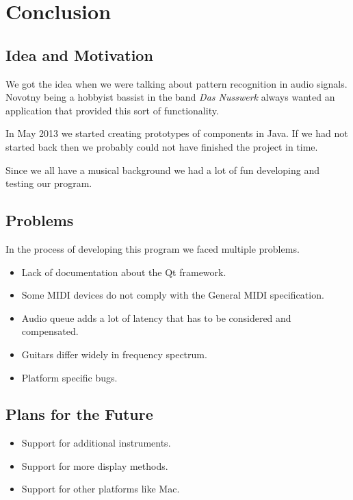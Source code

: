 \chapter{Conclusion}

\section{Idea and Motivation}

We got the idea when we were talking about pattern recognition in audio signals. Novotny being a hobbyist bassist in the band \emph{Das Nusswerk} always wanted an application that provided this sort of functionality. 

In May 2013 we started creating prototypes of components in Java. If we had not started back then we probably could not have finished the project in time.

Since we all have a musical background we had a lot of fun developing and testing our program. 

\section{Problems}

In the process of developing this program we faced multiple problems.

\begin{itemize}
	\item Lack of documentation about the Qt framework.
	\item Some MIDI devices do not comply with the General MIDI specification.
	\item Audio queue adds a lot of latency that has to be considered and compensated.
	\item Guitars differ widely in frequency spectrum.
	\item Platform specific bugs.
\end{itemize}

\section{Plans for the Future}



\begin{itemize}
	\item Support for additional instruments.
	\item Support for more display methods.
	\item Support for other platforms like Mac.
\end{itemize}

\section{}